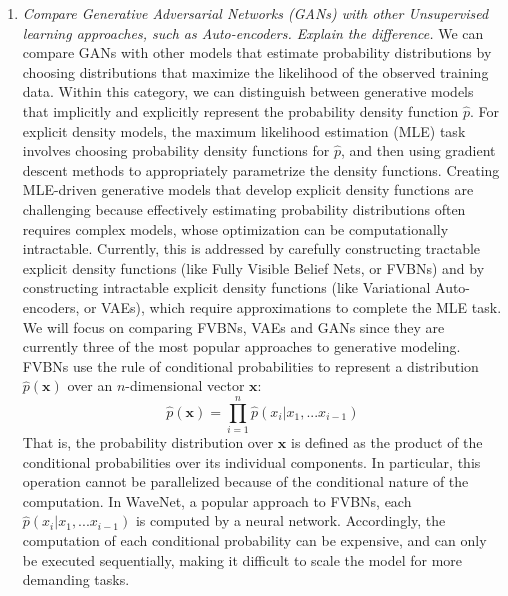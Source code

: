 \documentclass[a4paper]{article}
\begin{document}
\begin{enumerate}
{}
\item{\textit{Compare Generative Adversarial Networks (GANs) with other Unsupervised learning approaches, such as Auto-encoders. Explain the difference.}
\newline
\newline
We can compare GANs with other models that estimate probability distributions by choosing distributions that maximize the likelihood of the observed training data. Within this category, we can distinguish between generative models that implicitly and explicitly represent the probability density function $\hat{p}$. 
\newline
\newline
For explicit density models, the maximum likelihood estimation (MLE) task involves choosing probability density functions for $\hat{p}$, and then using gradient descent methods to appropriately parametrize the density functions. Creating MLE-driven generative models that develop explicit density functions are challenging because effectively estimating probability distributions often requires complex models, whose optimization can be computationally intractable. Currently, this is addressed by carefully constructing tractable explicit density functions (like Fully Visible Belief Nets, or FVBNs) and by constructing intractable explicit density functions (like Variational Auto-encoders, or VAEs), which require approximations to complete the MLE task. We will focus on comparing FVBNs, VAEs and GANs since they are currently three of the most popular approaches to generative modeling.
\newline
\newline
FVBNs use the rule of conditional probabilities to represent a distribution $\hat{p} \left( \textbf{x} \right) $ over an $n$-dimensional vector $\textbf{x}$:
$$\hat{p} \left( \textbf{x} \right) = \prod_{i=1}^n \hat{p} \left( x_i | x_1,...x_{i-1} \right) $$
That is, the probability distribution over $\textbf{x}$ is defined as the product of the conditional probabilities over its individual components. In particular, this operation cannot be parallelized because of the conditional nature of the computation. In WaveNet, a popular approach to FVBNs, each $\hat{p} \left( x_i | x_1,...x_{i-1} \right)$ is computed by a neural network. Accordingly, the computation of each conditional probability can be expensive, and can only be executed sequentially, making it difficult to scale the model for more demanding tasks. 
\newline
\newline
}
\end{enumerate}
\end{document}
